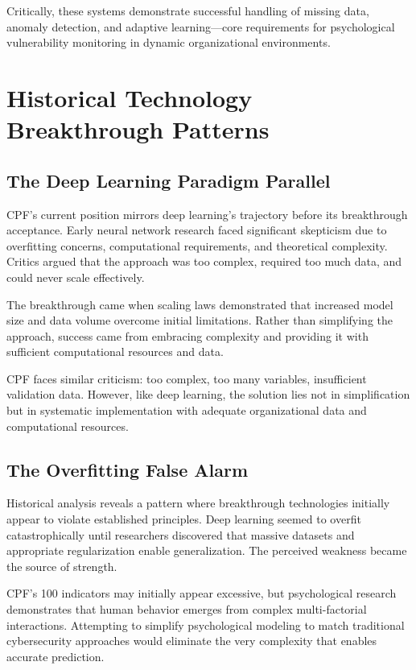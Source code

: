 \documentclass[11pt,a4paper]{article}
\begin{document}
Critically, these systems demonstrate successful handling of missing data, anomaly detection, and adaptive learning—core requirements for psychological vulnerability monitoring in dynamic organizational environments.

\section{Historical Technology Breakthrough Patterns}

\subsection{The Deep Learning Paradigm Parallel}

CPF's current position mirrors deep learning's trajectory before its breakthrough acceptance. Early neural network research faced significant skepticism due to overfitting concerns, computational requirements, and theoretical complexity. Critics argued that the approach was too complex, required too much data, and could never scale effectively.

The breakthrough came when scaling laws demonstrated that increased model size and data volume overcome initial limitations. Rather than simplifying the approach, success came from embracing complexity and providing it with sufficient computational resources and data.

CPF faces similar criticism: too complex, too many variables, insufficient validation data. However, like deep learning, the solution lies not in simplification but in systematic implementation with adequate organizational data and computational resources.

\subsection{The Overfitting False Alarm}

Historical analysis reveals a pattern where breakthrough technologies initially appear to violate established principles. Deep learning seemed to overfit catastrophically until researchers discovered that massive datasets and appropriate regularization enable generalization. The perceived weakness became the source of strength.

CPF's 100 indicators may initially appear excessive, but psychological research demonstrates that human behavior emerges from complex multi-factorial interactions. Attempting to simplify psychological modeling to match traditional cybersecurity approaches would eliminate the very complexity that enables accurate prediction.
\end{document}
